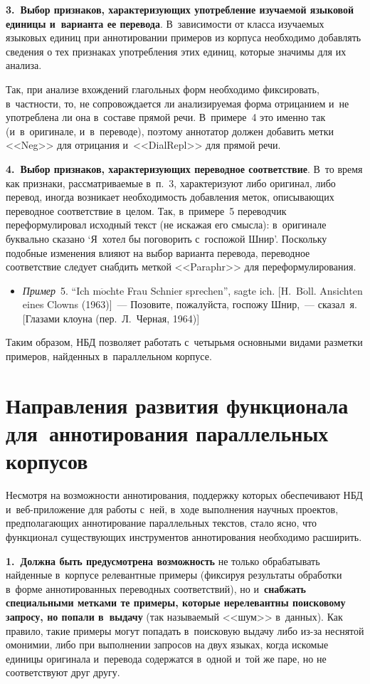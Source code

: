 \begin{multicols}{2}
\textbf{3.\ Выбор признаков, характеризующих употребление изучаемой 
языковой единицы и~варианта ее перевода}. В~зависимости от класса 
изучаемых языковых единиц при аннотировании примеров из корпуса 
необходимо добавлять сведения о тех признаках употребления этих единиц, 
которые значимы для их анализа.

Так, при анализе вхождений глагольных форм необходимо фиксировать, 
в~частности, то, не сопровождается ли анализируемая форма отрицанием 
и~не употреблена ли она в~составе прямой речи. В~примере~4 это именно 
так (и~в~оригинале, и~в~переводе), поэтому аннотатор должен добавить 
метки <<Neg>> для отрицания и~<<DialRepl>> для прямой речи.

\textbf{4.\ Выбор признаков, характеризующих переводное соответствие}. 
В~то время как признаки, рассматриваемые в~п.~3, характеризуют либо 
оригинал, либо перевод, иногда возникает необходимость добавления меток, 
опи\-сы\-ва\-ющих переводное соответствие в~целом. Так, в~примере~5 
переводчик переформулировал исходный текст (не искажая его смысла): 
в~оригинале буквально сказано `Я~хотел бы поговорить с~госпожой Шнир'. 
Поскольку подобные изменения влияют на выбор варианта перевода, 
переводное соответствие следует снабдить меткой <<Paraphr>> для 
переформулирования.

\begin{itemize}
\item[\,]
\textit{Пример}~5. ``Ich m$\ddot{\mbox{o}}$chte Frau Schnier sprechen'', sagte ich. 
[H.~B$\ddot{\mbox{o}}$ll. Ansichten eines Clowns (1963)]~--- Позовите, 
пожалуйста, госпожу Шнир,~--- сказал~я. [Глазами клоуна (пер.\ Л.~Черная, 1964)]
\end{itemize}

Таким образом, НБД позволяет работать с~че\-тырь\-мя основными видами разметки 
примеров, найден\-ных в~параллельном корпусе.

\section{Направления развития функционала для~аннотирования 
параллельных корпусов}

Несмотря на возможности аннотирования, поддержку которых обеспечивают 
НБД и~веб-при\-ло\-же\-ние для работы с~ней, в~ходе выполнения научных 
проектов, предполагающих аннотирование параллельных текстов, стало 
ясно, что функционал существующих инструментов аннотирования 
необходимо расширить.

\textbf{1.\ Должна быть предусмотрена возможность} не только 
обрабатывать найденные в~корпусе релевантные примеры (фиксируя 
результаты обработки в~форме аннотированных переводных \mbox{соответствий}), 
но и~\textbf{снабжать специальными метками те примеры, которые 
нерелевантны поисковому запросу, но попали в~выдачу} (так называемый 
<<шум>> в~данных). Как правило, такие примеры могут попадать 
в~поисковую выдачу либо из-за неснятой омонимии, либо при выполнении 
запросов на двух языках, когда искомые единицы оригинала и~перевода 
содержатся в~одной и~той же паре, но не соответствуют друг другу.


\end{multicols}
